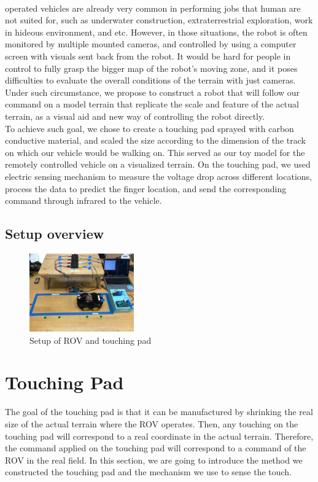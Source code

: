 \documentclass[reprint,amsmath, amsfonts, amssymb, aps, letterpaper]{revtex4-1}
\begin{document}
\\\Remotedly operated vehicles are already very common in performing jobs that human are not suited for, such as underwater construction, extraterrestrial exploration, work in hideous environment, and etc. However, in those situations, the robot is often monitored by multiple mounted cameras, and controlled by using a computer screen with visuals sent back from the robot. It would be hard for people in control to fully grasp the bigger map of the robot's moving zone, and it poses difficulties to evaluate the overall conditions of the terrain with just cameras. Under such circumstance, we propose to construct a robot that will follow our command on a model terrain that replicate the scale and feature of the actual terrain, as a visual aid and new way of controlling the robot directly.
\\\indent To achieve such goal, we chose to create a touching pad sprayed with carbon conductive material, and scaled the size according to the dimension of the track on which our vehicle would be walking on. This served as our toy model for the remotely controlled vehicle on a visualized terrain. On the touching pad, we used electric sensing mechanism to measure the voltage drop across different locations, process the data to predict the finger location, and send the corresponding command through infrared to the vehicle.

\subsection{Setup overview}
\begin{figure}[h]
\centering
    \includegraphics[width=0.4\textwidth]{./figure/setup}     
       \caption{Setup of ROV and touching pad }
    \label{fig::setup}
\end{figure}

\section{Touching Pad}
The goal of the touching pad is that it can be manufactured by shrinking the real size of the actual terrain where the ROV operates. Then, any touching on the touching pad will correspond to a real coordinate in the actual terrain. Therefore, the command applied on the touching pad will correspond to a command of the ROV in the real field. In this section, we are going to introduce the method we constructed the touching pad and the mechanism we use to sense the touch.
\end{document}
